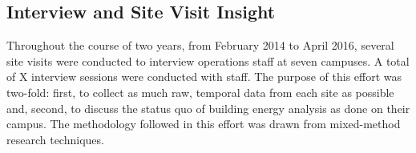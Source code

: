 \subsection{Interview and Site Visit Insight}
\label{sec:sitevisit}
Throughout the course of two years, from February 2014 to April 2016, several site visits were conducted to interview operations staff at seven campuses. A total of X interview sessions were conducted with staff. The purpose of this effort was two-fold: first, to collect as much raw, temporal data from each site as possible and, second, to discuss the status quo of building energy analysis as done on their campus. The methodology followed in this effort was drawn from mixed-method research techniques.